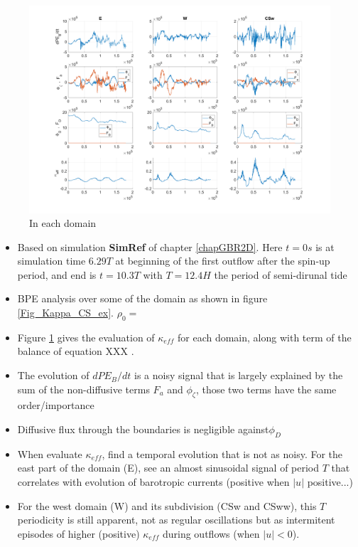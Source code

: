 \begin{figure}[h!]
\centering
\includegraphics[width=1\textwidth]{./CHAP_BPE/Fig_Kappa_CS.png}
\caption{In each domain}
\label{figCgbr2d}
\end{figure}
\begin{itemize}
\item Based on simulation \textbf{SimRef} of chapter \ref{chapGBR2D}. Here $t=0s$ is at simulation time $6.29T$ at beginning of the first outflow after the spin-up period, and end is $t=10.3T$ with $T=12.4H$ the period of semi-dirunal tide
\item BPE analysis over some of the domain as shown in figure \ref{Fig_Kappa_CS_ex}. \color{red}$\rho_0=$\color{black}
\item Figure \ref{figCgbr2d} gives the evaluation of $\kappa_{eff}$ for each domain, along with term of the balance of equation XXX . 
\item The evolution of $dPE_B/dt$ is a noisy signal that is largely explained by the sum of the non-diffusive terms $F_a$ and $\phi_{\zeta}$, those two terms have the same order/importance
\item Diffusive flux through the boundaries is negligible against$\phi_D$ 
\item When evaluate $\kappa_{eff}$, find a temporal evolution that is not as noisy. For the east part of the domain (E), see an almost sinusoidal signal of period $T$ that correlates with evolution of barotropic currents (positive when $|u|$ positive...)
\item For the west domain (W) and its subdivision (CSw and CSww), this $T$ periodicity is still apparent, not as regular oscillations but as intermitent episodes of higher (positive) $\kappa_{eff}$ during outflows (when $|u|<0$).
\end{itemize}


